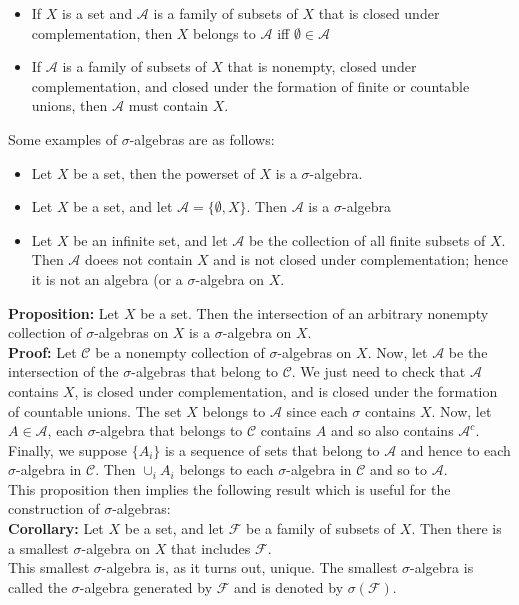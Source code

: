 \documentclass{article}
\begin{document}
\begin{itemize}
    \item If \(X\) is a set and \(\mathcal{A}\) is a family of subsets of \(X\) that is closed under complementation, then \(X\) belongs to \(\mathcal{A}\) iff \(\emptyset\in\mathcal{A}\)
    \item If \(\mathcal{A}\) is a family of subsets of \(X\) that is nonempty, closed under complementation, and closed under the formation of finite or countable unions, then \(\mathcal{A}\) must contain \(X\).
\end{itemize}
Some examples of \(\sigma\)-algebras are as follows:
\begin{itemize}
    \item Let \(X\) be a set, then the powerset of \(X\) is a \(\sigma\)-algebra.
    \item Let \(X\) be a set, and let \(\mathcal{A}=\{\emptyset, X\}\). Then \(\mathcal{A}\) is a \(\sigma\)-algebra
    \item Let \(X\) be an infinite set, and let \(\mathcal{A}\) be the collection of all finite subsets of \(X\). Then \(\mathcal{A}\) doees not contain \(X\) and is not closed under complementation; hence it is not an algebra (or a \(\sigma\)-algebra on \(X\).
\end{itemize}

\textbf{Proposition:} Let \(X\) be a set. Then the intersection of an arbitrary nonempty collection of \(\sigma\)-algebras on \(X\) is a \(\sigma\)-algebra on \(X\).\\
\textbf{Proof:} Let \(\mathcal{C}\) be a nonempty collection of \(\sigma\)-algebras on \(X\). Now, let \(\mathcal{A}\) be the intersection of the \(\sigma\)-algebras that belong to \(\mathcal{C}\). We just need to check that \(\mathcal{A}\) contains \(X\), is closed under complementation, and is closed under the formation of countable unions. The set \(X\) belongs to \(\mathcal{A}\) since each \(\sigma\) contains \(X\). Now, let \(A\in\mathcal{A}\), each \(\sigma\)-algebra that belongs to \(\mathcal{C}\) contains \(A\) and so also contains \(\mathcal{A}^c\). Finally, we suppose \(\{A_i\}\) is a sequence of sets that belong to \(\mathcal{A}\) and hence to each \(\sigma\)-algebra in \(\mathcal{C}\). Then \(\cup_i A_i\) belongs to each \(\sigma\)-algebra in \(\mathcal{C}\) and so to \(\mathcal{A}\).\\

This proposition then implies the following result which is useful for the construction of \(\sigma\)-algebras:\\
\textbf{Corollary:} Let \(X\) be a set, and let \(\mathcal{F}\) be a family of subsets of \(X\). Then there is a smallest \(\sigma\)-algebra on \(X\) that includes \(\mathcal{F}\).\\
This smallest \(\sigma\)-algebra is, as it turns out, unique. The smallest \(\sigma\)-algebra is called the \(\sigma\)-algebra generated by \(\mathcal{F}\) and is denoted by \(\sigma(\mathcal{F})\).\\
\end{document}
